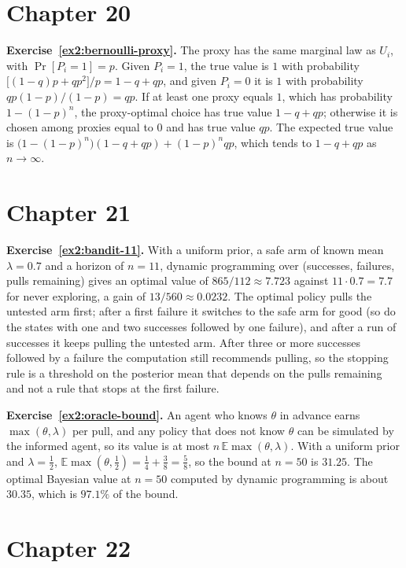 \section*{Chapter 20}

\textbf{Exercise~\ref{ex2:bernoulli-proxy}.} The proxy has the same marginal law as $U_i$, with $\Pr[P_i=1]=p$. Given $P_i=1$, the true value is $1$ with probability $\bigl[(1-q)p+qp^{2}\bigr]/p=1-q+qp$, and given $P_i=0$ it is $1$ with probability $qp(1-p)/(1-p)=qp$. If at least one proxy equals $1$, which has probability $1-(1-p)^{n}$, the proxy-optimal choice has true value $1-q+qp$; otherwise it is chosen among proxies equal to $0$ and has true value $qp$. The expected true value is $\bigl(1-(1-p)^{n}\bigr)(1-q+qp)+(1-p)^{n}qp$, which tends to $1-q+qp$ as $n\to\infty$.

\section*{Chapter 21}

\textbf{Exercise~\ref{ex2:bandit-11}.} With a uniform prior, a safe arm of known mean $\lambda=0.7$ and a horizon of $n=11$, dynamic programming over (successes, failures, pulls remaining) gives an optimal value of $865/112\approx7.723$ against $11\cdot0.7=7.7$ for never exploring, a gain of $13/560\approx0.0232$. The optimal policy pulls the untested arm first; after a first failure it switches to the safe arm for good (so do the states with one and two successes followed by one failure), and after a run of successes it keeps pulling the untested arm. After three or more successes followed by a failure the computation still recommends pulling, so the stopping rule is a threshold on the posterior mean that depends on the pulls remaining and not a rule that stops at the first failure.

\textbf{Exercise~\ref{ex2:oracle-bound}.} An agent who knows $\theta$ in advance earns $\max(\theta,\lambda)$ per pull, and any policy that does not know $\theta$ can be simulated by the informed agent, so its value is at most $n\,\mathbb E\max(\theta,\lambda)$. With a uniform prior and $\lambda=\tfrac12$, $\mathbb E\max(\theta,\tfrac12)=\tfrac14+\tfrac38=\tfrac58$, so the bound at $n=50$ is $31.25$. The optimal Bayesian value at $n=50$ computed by dynamic programming is about $30.35$, which is $97.1\%$ of the bound.

\section*{Chapter 22}

